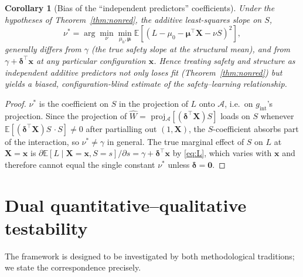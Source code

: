 \documentclass{amsart}
\theoremstyle{definition}
\theoremstyle{plain}
\newtheorem{corollary}{Corollary}
\begin{document}
\begin{corollary}[Bias of the ``independent predictors'' coefficients]\label{cor:bias}
Under the hypotheses of Theorem~\ref{thm:nonred}, the additive least-squares slope on $S$,
\[
\nu^\ast=\arg\min_\nu \min_{\mu_0,\bm\mu}\mathbb E[(L-\mu_0-\bm\mu^\top\bm X-\nu S)^2],
\]
generally differs from $\gamma$ (the true safety slope at the structural mean), and from
$\gamma+\bm\delta^\top\bm x$ at any particular configuration $\bm x$. Hence treating safety
and structure as independent additive predictors not only loses fit
(Theorem~\ref{thm:nonred}) but yields a biased, configuration-blind estimate of the
safety--learning relationship.
\end{corollary}
\begin{proof}
$\nu^\ast$ is the coefficient on $S$ in the projection of $L$ onto $\mathcal A$, i.e.\ on
$g_{\mathrm{int}}$'s projection. Since the projection of $\hat W=$ proj$_{\mathcal A}
[(\bm\delta^\top\bm X)S]$ loads on $S$ whenever $\mathbb E[(\bm\delta^\top\bm X)S\,\cdot
S]\neq 0$ after partialling out $(1,\bm X)$, the $S$-coefficient absorbs part of the
interaction, so $\nu^\ast\neq\gamma$ in general. The true marginal effect of $S$ on $L$ at
$\bm X=\bm x$ is $\partial \mathbb E[L\mid\bm X=\bm x,S=s]/\partial s=\gamma+\bm\delta^\top
\bm x$ by \eqref{eq:L}, which varies with $\bm x$ and therefore cannot equal the single
constant $\nu^\ast$ unless $\bm\delta=\bm0$.
\end{proof}

\section{Dual quantitative--qualitative testability}

The framework is designed to be investigated by both methodological traditions; we state the
correspondence precisely.
\end{document}
